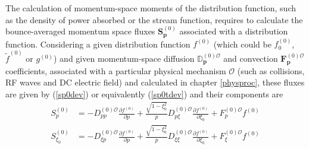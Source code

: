 
The calculation of momentum-space moments of the distribution
function, such as the density of power absorbed or the stream
function, requires to calculate the bounce-averaged momentum space
fluxes $\mathbf{S}_{\mathbf{p}}^{(0)}$ associated with a
distribution function. Considering a given distribution
function $f^{\left(  0\right)  }$ (which could be $f_{0}^{\left(  0\right)  }%
$, $\widetilde{f}^{\left(  0\right)  }$ or $g^{\left(  0\right)  }$) and given
momentum-space diffusion $\mathbb{D}_{\mathbf{p}}^{\left(  0\right)
\mathcal{O}}$ and convection $\mathbf{F}_{\mathbf{p}}^{\left(  0\right)
\mathcal{O}}$coefficients, associated with a particular physical mechanism
$\mathcal{O}$ (such as collisions, RF waves and DC electric field) and
calculated in chapter \ref{physproc}, these fluxes are given by (\ref{sp0dev})
or equivalently (\ref{sp0tdev}) and their components are
\begin{align}
S_{p}^{(0)} &  =-D_{pp}^{(0)\mathcal{O}}\frac{\partial f^{(0)}}{\partial
p}+\frac{\sqrt{1-\xi_{0}^{2}}}{p}D_{p\xi}^{(0)\mathcal{O}}\frac{\partial
f^{(0)}}{\partial\xi_{0}}+F_{p}^{(0)\mathcal{O}}f^{(0)}\\
S_{\xi_{0}}^{(0)} &  =-D_{\xi p}^{(0)\mathcal{O}}\frac{\partial f^{(0)}%
}{\partial p}+\frac{\sqrt{1-\xi_{0}^{2}}}{p}D_{\xi\xi}^{(0)\mathcal{O}}%
\frac{\partial f^{(0)}}{\partial\xi_{0}}+F_{\xi}^{(0)\mathcal{O}}f^{(0)}%
\end{align}

